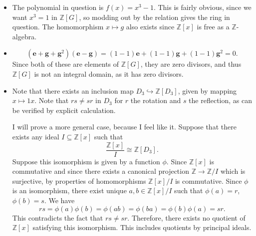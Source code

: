 \documentclass[11pt, letterpaper]{article}
\begin{document}
\begin{itemize}
		\[
			\frac{\mathbb{Z} [G]}{\ker \varepsilon } \cong \im \varepsilon =\mathbb{Z} 
		.\]
	\item The polynomial in question is $f(x)=x^3-1$. This is fairly obvious, since we want $x^3=1$ in $\mathbb{Z} [G]$, so modding out by the relation gives the ring in question. The homomorphism $x\mapsto g$ also exists since $\mathbb{Z} [x]$ is free as a $\mathbb{Z} $-algebra.
	\item 
		\[
			\left( \mathbf{e} +\mathbf{g} +\mathbf{g} ^2 \right) \left( \mathbf{e} -\mathbf{g}  \right) =(1-1)\mathbf{e} +(1-1)\mathbf{g} +(1-1)\mathbf{g} ^2=0
		.\]
		Since both of these are elements of $\mathbb{Z} [G]$, they are zero divisors, and thus $\mathbb{Z} [G]$ is not an integral domain, as it has zero divisors.
	\item Note that there exists an inclusion map $D_3 \hookrightarrow \mathbb{Z} [D_3]$, given by mapping $x\mapsto 1x$. Note that $rs\neq sr$ in $D_3$ for $r$ the rotation and $s$ the reflection, as can be verified by explicit calculation.

		I will prove a more general case, because I feel like it. Suppose that there exists any ideal $I\subseteq \mathbb{Z} [x]$ such that
		\[
			\frac{\mathbb{Z} [x]}{I} \cong \mathbb{Z} [D_3]
		.\]
		Suppose this isomorphism is given by a function $\phi $. Since $\mathbb{Z} [x]$ is commutative and since there exists a canonical projection $\mathbb{Z} \to \mathbb{Z} /I$ which is surjective, by properties of homomorphisms $\mathbb{Z} [x]/I$ is commutative. Since $\phi $ is an isomorphism, there exist unique $a,b\in \mathbb{Z} [x]/I$ such that $\phi (a)=r$, $\phi (b)=s$. We have
		\[
			rs=\phi (a)\phi (b)=\phi (ab)=\phi (ba)=\phi (b)\phi (a)=sr
		.\]
		This contradicts the fact that $rs\neq sr$. Therefore, there exists no quotient of $\mathbb{Z} [x]$ satisfying this isomorphism. This includes quotients by principal ideals.
\end{itemize}
\end{document}
